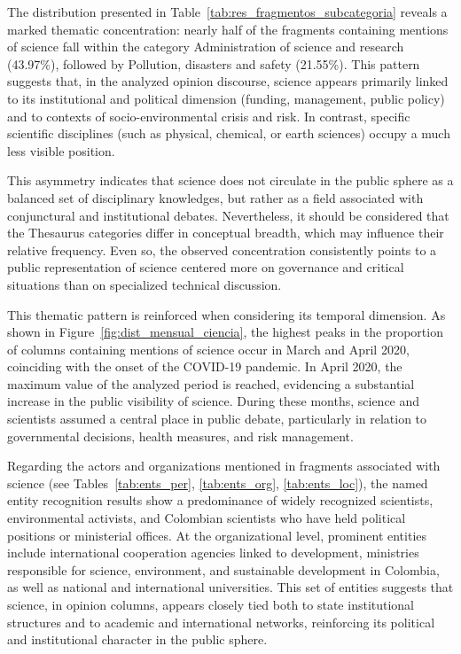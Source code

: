 \documentclass[11pt,a4paper]{article}
\begin{document}
The distribution presented in Table~\ref{tab:res_fragmentos_subcategoria} reveals a marked thematic concentration: nearly half of the fragments containing mentions of science fall within the category Administration of science and research (43.97\%), followed by Pollution, disasters and safety (21.55\%). This pattern suggests that, in the analyzed opinion discourse, science appears primarily linked to its institutional and political dimension (funding, management, public policy) and to contexts of socio-environmental crisis and risk. In contrast, specific scientific disciplines (such as physical, chemical, or earth sciences) occupy a much less visible position.


This asymmetry indicates that science does not circulate in the public sphere as a balanced set of disciplinary knowledges, but rather as a field associated with conjunctural and institutional debates. Nevertheless, it should be considered that the Thesaurus categories differ in conceptual breadth, which may influence their relative frequency. Even so, the observed concentration consistently points to a public representation of science centered more on governance and critical situations than on specialized technical discussion.

This thematic pattern is reinforced when considering its temporal dimension. As shown in Figure~\ref{fig:dist_mensual_ciencia}, the highest peaks in the proportion of columns containing mentions of science occur in March and April 2020, coinciding with the onset of the COVID-19 pandemic. In April 2020, the maximum value of the analyzed period is reached, evidencing a substantial increase in the public visibility of science. During these months, science and scientists assumed a central place in public debate, particularly in relation to governmental decisions, health measures, and risk management.


Regarding the actors and organizations mentioned in fragments associated with science (see Tables~\ref{tab:ents_per}, \ref{tab:ents_org}, \ref{tab:ents_loc}), the named entity recognition results show a predominance of widely recognized scientists, environmental activists, and Colombian scientists who have held political positions or ministerial offices. At the organizational level, prominent entities include international cooperation agencies linked to development, ministries responsible for science, environment, and sustainable development in Colombia, as well as national and international universities. This set of entities suggests that science, in opinion columns, appears closely tied both to state institutional structures and to academic and international networks, reinforcing its political and institutional character in the public sphere.
\end{document}

